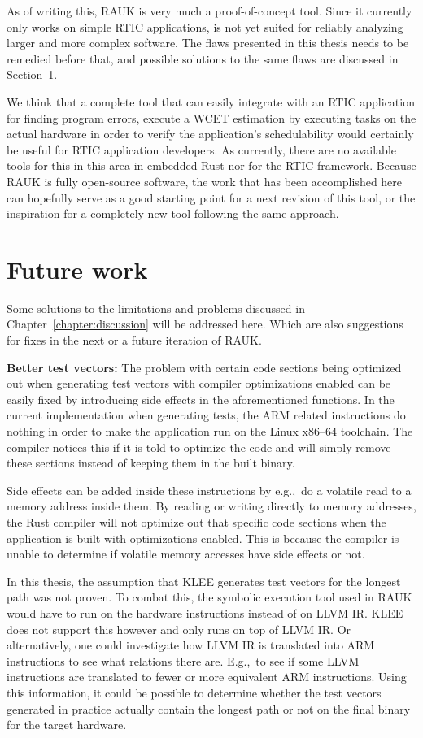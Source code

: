 As of writing this, RAUK is very much a proof-of-concept tool. Since it
currently only works on simple RTIC applications, is not yet suited for
reliably analyzing larger and more complex software. The flaws presented in
this thesis needs to be remedied before that, and possible solutions to the
same flaws are discussed in Section~\ref{chapter:futurework}.

We think that a complete tool that can easily integrate with an RTIC
application for finding program errors, execute a WCET estimation by executing
tasks on the actual hardware in order to verify the application's
schedulability would certainly be useful for RTIC application developers. As
currently, there are no available tools for this in this area in embedded Rust
nor for the RTIC framework. Because RAUK is fully open-source software, the
work that has been accomplished here can hopefully serve as a good starting
point for a next revision of this tool, or the inspiration for a completely new
tool following the same approach.

\section{Future work}
\label{chapter:futurework}
Some solutions to the limitations and problems discussed in
Chapter~\ref{chapter:discussion} will be addressed here. Which are also
suggestions for fixes in the next or a future iteration of RAUK\@.

\textbf{Better test vectors:} The problem with certain code sections being
optimized out when generating test vectors with compiler optimizations enabled
can be easily fixed by introducing side effects in the aforementioned
functions. In the current implementation when generating tests, the ARM related
instructions do nothing in order to make the application run on the Linux
x86--64 toolchain. The compiler notices this if it is told to optimize the code
and will simply remove these sections instead of keeping them in the built
binary.

Side effects can be added inside these instructions by e.g.,\ do a volatile
read to a memory address inside them. By reading or writing directly to memory
addresses, the Rust compiler will not optimize out that specific code sections
when the application is built with optimizations enabled. This is because the
compiler is unable to determine if volatile memory accesses have side effects
or not.

In this thesis, the assumption that KLEE generates test vectors for the longest
path was not proven. To combat this, the symbolic execution tool used in RAUK
would have to run on the hardware instructions instead of on LLVM IR\@. KLEE does
not support this however and only runs on top of LLVM IR\@. Or alternatively, one
could investigate how LLVM IR is translated into ARM instructions to see what
relations there are. E.g.,\ to see if some LLVM instructions are translated to
fewer or more equivalent ARM instructions. Using this information, it could
be possible to determine whether the test vectors generated in practice
actually contain the longest path or not on the final binary for the target
hardware.

